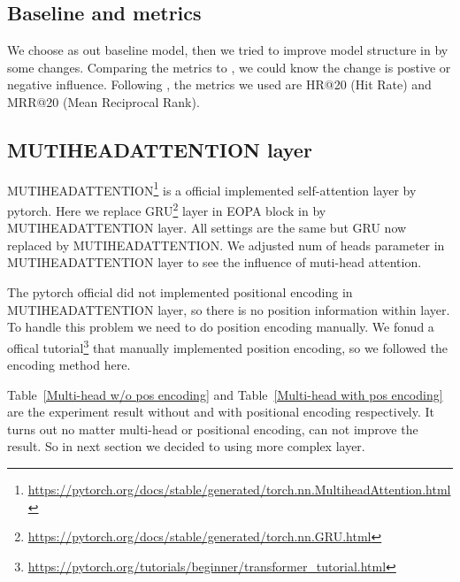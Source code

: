 \documentclass{article}
\begin{document}
\subsection{Baseline and metrics}

We choose \cite{chen2020lessr} as out baseline model,
then we tried to improve model structure in \cite{chen2020lessr} by some changes.
Comparing the metrics to \cite{chen2020lessr},
we could know the change is postive or negative influence.
Following \cite{chen2020lessr},
the metrics we used are HR@20 (Hit Rate) and MRR@20 (Mean Reciprocal Rank).

\subsection{MUTIHEADATTENTION layer}

MUTIHEADATTENTION\footnote{\url{https://pytorch.org/docs/stable/generated/torch.nn.MultiheadAttention.html}}
is a official implemented self-attention layer by pytorch.
Here we replace GRU\footnote{\url{https://pytorch.org/docs/stable/generated/torch.nn.GRU.html}}
layer in EOPA block in \cite{chen2020lessr} by MUTIHEADATTENTION layer.
All settings are the same but GRU now replaced by MUTIHEADATTENTION.
We adjusted num of heads parameter in MUTIHEADATTENTION layer
to see the influence of muti-head attention.

The pytorch official did not implemented positional encoding in
MUTIHEADATTENTION layer, so there is no position information within layer.
To handle this problem we need to do position encoding manually.
We fonud a offical tutorial\footnote{\url{https://pytorch.org/tutorials/beginner/transformer_tutorial.html}}
that manually implemented position encoding,
so we followed the encoding method here.

Table~\ref{Multi-head w/o pos encoding} and Table~\ref{Multi-head with pos encoding}
are the experiment result without and with positional encoding respectively.
It turns out no matter multi-head or positional encoding, can not improve the result.
So in next section we decided to using more complex layer.
\end{document}
